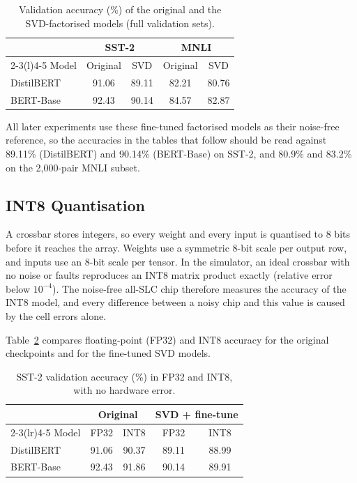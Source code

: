 \documentclass[conference]{IEEEtran}
\begin{document}
\begin{table}[t]
\caption{Validation accuracy (\%) of the original and the SVD-factorised models (full validation sets).}
\label{tab:svd}
\centering
\begin{tabular}{lcccc}
\toprule
 & \multicolumn{2}{c}{SST-2} & \multicolumn{2}{c}{MNLI} \\
\cmidrule(lr){2-3}\cmidrule(l){4-5}
Model & Original & SVD & Original & SVD \\
\midrule
DistilBERT & 91.06 & 89.11 & 82.21 & 80.76 \\
BERT-Base  & 92.43 & 90.14 & 84.57 & 82.87 \\
\bottomrule
\end{tabular}
\end{table}

All later experiments use these fine-tuned factorised models as their noise-free reference, so the
accuracies in the tables that follow should be read against 89.11\% (DistilBERT) and 90.14\% (BERT-Base)
on SST-2, and 80.9\% and 83.2\% on the 2,000-pair MNLI subset.

\subsection{INT8 Quantisation}
A crossbar stores integers, so every weight and every input is quantised to 8 bits before it reaches the
array. Weights use a symmetric 8-bit scale per output row, and inputs use an 8-bit scale per tensor. In the
simulator, an ideal crossbar with no noise or faults reproduces an INT8 matrix product exactly (relative
error below $10^{-4}$). The noise-free all-SLC chip therefore measures the accuracy of the INT8 model, and
every difference between a noisy chip and this value is caused by the cell errors alone.

Table~\ref{tab:int8} compares floating-point (FP32) and INT8 accuracy for the original checkpoints and for
the fine-tuned SVD models.

\begin{table}[t]
\caption{SST-2 validation accuracy (\%) in FP32 and INT8, with no hardware error.}
\label{tab:int8}
\centering
\begin{tabular}{lcccc}
\toprule
 & \multicolumn{2}{c}{Original} & \multicolumn{2}{c}{SVD + fine-tune} \\
\cmidrule(lr){2-3}\cmidrule(lr){4-5}
Model & FP32 & INT8 & FP32 & INT8 \\
\midrule
DistilBERT & 91.06 & 90.37 & 89.11 & 88.99 \\
BERT-Base  & 92.43 & 91.86 & 90.14 & 89.91 \\
\bottomrule
\end{tabular}
\end{table}
\end{document}
